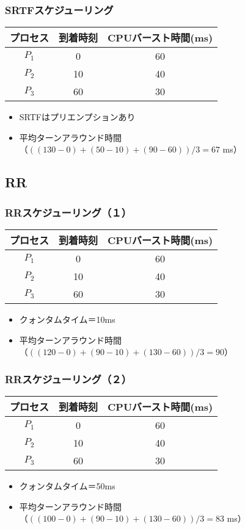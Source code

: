 \documentclass[unicode]{beamer}                   %
\begin{document}
\begin{frame}
  \frametitle{SRTFスケジューリング}
  \small\begin{tabular}{c c c}
    プロセス & 到着時刻 & CPUバースト時間(ms) \\
    \hline
    $P_1$    & 0  & 60 \\
    $P_2$    & 10 & 40 \\
    $P_3$    & 60 & 30 \\
  \end{tabular}
  \begin{itemize}
    \item SRTFはプリエンプションあり
    \item 平均ターンアラウンド時間\\
      （$((130-0)+(50-10)+(90-60))/3=67$ ms）
  \end{itemize}
\end{frame}

\subsection{RR}
\begin{frame}
  \frametitle{RRスケジューリング（１）}
  \small\begin{tabular}{c c c}
    プロセス & 到着時刻 & CPUバースト時間(ms) \\
    \hline
    $P_1$    & 0  & 60 \\
    $P_2$    & 10 & 40 \\
    $P_3$    & 60 & 30 \\
  \end{tabular}
  \begin{itemize}
    \item クォンタムタイム＝10ms
    \item 平均ターンアラウンド時間\\
      （$((120-0)+(90-10)+(130-60))/3=90$）
  \end{itemize}
\end{frame}

\begin{frame}
  \frametitle{RRスケジューリング（２）}
  \small\begin{tabular}{c c c}
    プロセス & 到着時刻 & CPUバースト時間(ms) \\
    \hline
    $P_1$    & 0  & 60 \\
    $P_2$    & 10 & 40 \\
    $P_3$    & 60 & 30 \\
  \end{tabular}
  \begin{itemize}
    \item クォンタムタイム＝50ms
    \item 平均ターンアラウンド時間\\
      （$((100-0)+(90-10)+(130-60))/3=83$ ms）
  \end{itemize}
\end{frame}
\end{document}
